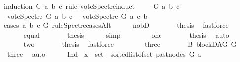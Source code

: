 \begin{isabellebody}
%
\isadelimproof
%
\endisadelimproof
%
\isatagproof
{}\isamarkupfalse%
{\isacharparenleft}{\kern0pt}induction\ G\ a\ b\ c\ rule{\isacharcolon}{\kern0pt}\ vote{\isacharunderscore}{\kern0pt}Spectre{\isachardot}{\kern0pt}induct{\isacharparenright}{\kern0pt}\isanewline
\ \ \isamarkupfalse%
\ {\isacharparenleft}{\kern0pt}{}\ G\ a\ b\ c{\isacharparenright}{\kern0pt}\isanewline
\ \ \isamarkupfalse%
\ {\isachardoublequoteopen}vote{\isacharunderscore}{\kern0pt}Spectre\ G\ a\ b\ c\ {\isacharequal}{\kern0pt}\ {\isacharminus}{\kern0pt}\ vote{\isacharunderscore}{\kern0pt}Spectre\ G\ a\ c\ b{\isachardoublequoteclose}\isanewline
\ \ \isamarkupfalse%
{\isacharparenleft}{\kern0pt}cases\ a\ b\ c\ G\ rule{\isacharcolon}{\kern0pt}Spectre{\isacharunderscore}{\kern0pt}casesAlt{\isacharparenright}{\kern0pt}\isanewline
\ \ \ \ \isamarkupfalse%
\ no{\isacharunderscore}{\kern0pt}bD\isanewline
\ \ \ \ \isamarkupfalse%
\ \isamarkupfalse%
\ {\isacharquery}{\kern0pt}thesis\ \isamarkupfalse%
\ fastforce\isanewline
\ \ \isamarkupfalse%
\isanewline
\ \ \ \ \isamarkupfalse%
\ equal\isanewline
\ \ \ \ \isamarkupfalse%
\ \isamarkupfalse%
\ {\isacharquery}{\kern0pt}thesis\ \isamarkupfalse%
\ {}\ \ \isamarkupfalse%
\ simp\isanewline
\ \ \isamarkupfalse%
\isanewline
\ \ \ \ \isamarkupfalse%
\ one\isanewline
\ \ \ \ \isamarkupfalse%
\ \isamarkupfalse%
\ {\isacharquery}{\kern0pt}thesis\ \isamarkupfalse%
\ auto\ \ \ \isanewline
\ \ \isamarkupfalse%
\isanewline
\ \ \ \ \isamarkupfalse%
\ two\isanewline
\ \ \ \ \isamarkupfalse%
\ \isamarkupfalse%
\ {\isacharquery}{\kern0pt}thesis\ \isamarkupfalse%
\ fastforce\isanewline
\ \ \isamarkupfalse%
\isanewline
\ \ \ \ \isamarkupfalse%
\ three\isanewline
\ \ \ \ \isamarkupfalse%
\ \isamarkupfalse%
\ B{}{\isacharcolon}{\kern0pt}\ blockDAG\ G\ \isamarkupfalse%
\ three\ \isamarkupfalse%
\ auto\isanewline
\ \ \ \ \isamarkupfalse%
\ Ind{\isacharcolon}{\kern0pt}\ {\isachardoublequoteopen}{\isasymforall}\ x\ {\isasymin}\ set\ {\isacharparenleft}{\kern0pt}\ sorted{\isacharunderscore}{\kern0pt}list{\isacharunderscore}{\kern0pt}of{\isacharunderscore}{\kern0pt}set\ {\isacharparenleft}{\kern0pt}past{\isacharunderscore}{\kern0pt}nodes\ G\ a{\isacharparenright}{\kern0pt}{\isacharparenright}{\kern0pt}{\isachardot}{\kern0pt}\ \isanewline

\end{isabellebody}
